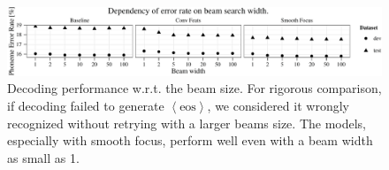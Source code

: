 \documentclass{article} %
\begin{document}




\begin{figure}[t]
  \centering
  \includegraphics[width=\textwidth]{beam_influence}
  \caption{Decoding performance w.r.t. the beam size.
      For rigorous comparison, if decoding failed to generate
      $\left<\text{eos}\right>$, we considered it wrongly recognized without
      retrying with a larger beams size. The models, especially with smooth focus, 
      perform well even
      with a beam width as small as 1.
  }
  \label{fig:beam_dependency}

  \vspace{-4mm}
\end{figure}
\end{document}
